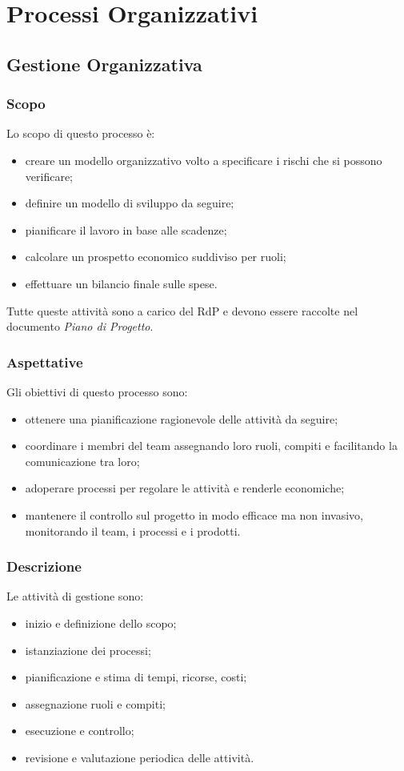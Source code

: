 \section{Processi Organizzativi}
	\subsection{Gestione Organizzativa}
		\subsubsection{Scopo}

		Lo scopo di questo processo è:
		\begin{itemize}
			\item creare un modello organizzativo volto a specificare i rischi che si possono verificare;
			\item definire un modello di sviluppo da seguire;
			\item pianificare il lavoro in base alle scadenze;
			\item calcolare un prospetto economico suddiviso per ruoli;
			\item effettuare un bilancio finale sulle spese.
		\end{itemize}
		Tutte queste attività sono a carico del RdP e devono essere raccolte nel documento \textit{Piano di Progetto}.

		\subsubsection{Aspettative}
		Gli obiettivi di questo processo sono:
		\begin{itemize}
			\item ottenere una pianificazione ragionevole delle attività da seguire;
			\item coordinare i membri del team assegnando loro ruoli, compiti e facilitando la comunicazione tra loro;
			\item adoperare processi per regolare le attività e renderle economiche;
			\item mantenere il controllo sul progetto in modo efficace ma non invasivo, monitorando il team, i processi e i prodotti.
		\end{itemize}
		\subsubsection{Descrizione}
		Le attività di gestione sono:
		\begin{itemize}
			\item inizio e definizione dello scopo;
			\item istanziazione dei processi;
			\item pianificazione e stima di tempi, ricorse, costi;
			\item assegnazione ruoli e compiti;
			\item esecuzione e controllo;
			\item revisione e valutazione periodica delle attività.
		\end{itemize}
